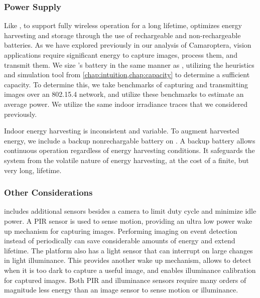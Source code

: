 \subsubsection{Power Supply}
Like \name, to support fully wireless operation for a long lifetime, \namec optimizes energy harvesting and storage through the use of rechargeable and non-rechargeable batteries.
As we have explored previously in our analysis of Camaroptera, vision applications require significant energy to capture images, process them, and transmit them. 
We size \namec's battery in the same manner as \name, utilizing the heuristics and simulation tool from \cref{chap:intuition,chap:capacity} to determine a sufficient capacity.
To determine this, we take benchmarks of capturing and transmitting images over an 802.15.4 network, and utilize these benchmarks to estimate an average power.
We utilize the same indoor irradiance traces that we considered previously.

Indoor energy harvesting is inconsistent and variable.
To augment harvested energy, we include a backup nonrechargable battery on \namec. A backup battery allows continuous operation regardless of energy harvesting conditions. 
It safeguards the system from the volatile nature of energy harvesting, at the cost of a finite, but very long, lifetime.

\subsubsection{Other Considerations}
\namec includes additional sensors besides a camera to limit duty cycle and minimize idle power. A PIR sensor is used to sense motion, providing an ultra low power wake up mechanism for capturing images. Performing imaging on event detection instead of periodically can save considerable amounts of energy and extend lifetime. The platform also has a light sensor that can interrupt on large changes in light illuminance. This provides another wake up mechanism, allows \namec to detect when it is too dark to capture a useful image, and enables illuminance calibration for captured images. Both PIR and illuminance sensors require many orders of magnitude less energy than an image sensor to sense motion or illuminance.

